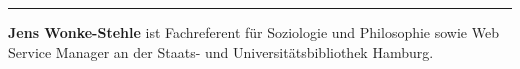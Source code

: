\begin{center}\rule{0.5\linewidth}{\linethickness}\end{center}

\textbf{Jens Wonke-Stehle} ist Fachreferent für Soziologie und
Philosophie sowie Web Service Manager an der Staats- und
Universitätsbibliothek Hamburg.
